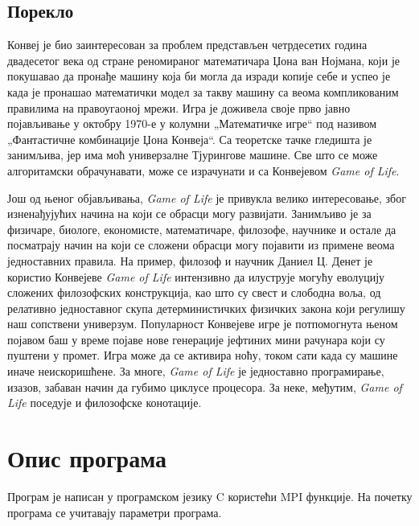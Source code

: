 \subsection{Порекло}
Конвеј је био заинтересован за проблем представљен четрдесетих година двадесетог века од стране реномираног математичара Џона ван Нојмана, који је покушавао да пронађе машину која би могла да изради копије себе и успео је када је пронашао математички модел за такву машину са веома компликованим правилима на правоугаоној мрежи. Игра је доживела своје прво јавно појављивање у октобру 1970-е у колумни „Математичке игре“ под називом „Фантастичне комбинације Џона Конвеја“. Са теоретске тачке гледишта је занимљива, јер има моћ универзалне Тјурингове машине. Све што се може алгоритамски обрачунавати, може се израчунати и са Конвејевом \textit{Game of Life}.

Још од њеног објављивања, \textit{Game of Life} је привукла велико интересовање, због изненађујућих начина на који се обрасци могу развијати. Занимљиво је за физичаре, биологе, економисте, математичаре, филозофе, научнике и остале да посматрају начин на који се сложени обрасци могу појавити из примене веома једноставних правила. На пример, филозоф и научник Даниел Ц. Денет је користио Конвејеве \textit{Game of Life}  интензивно да илуструје могућу еволуцију сложених филозофских конструкција, као што су свест и слободна воља, од релативно једноставног скупа детерминистичких физичких закона који регулишу наш сопствени универзум.
Популарност Конвејеве игре је потпомогнута њеном појавом баш у време појаве нове генерације јефтиних мини рачунара који су пуштени у промет. Игра може да се активира ноћу, током сати када су машине иначе неискоришћене. За многе, \textit{Game of Life} је једноставно програмирање, изазов, забаван начин да губимо циклусе процесора. За неке, међутим, \textit{Game of Life} поседује и филозофске конотације.

\section{Опис програма}
Програм је написан у програмском језику C користећи MPI функције. На почетку програма се учитавају параметри програма. 


